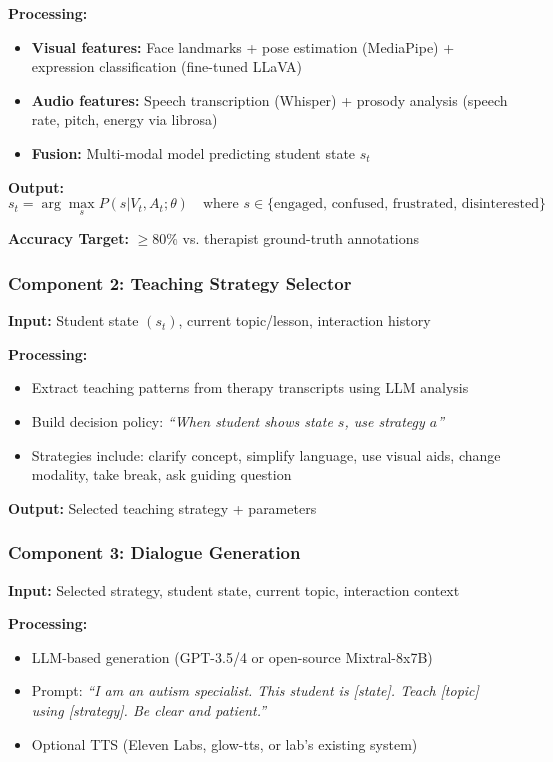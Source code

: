 \documentclass[12pt, a4paper]{article}
\begin{document}
\textbf{Processing:}
\begin{itemize}
    \item \textbf{Visual features:} Face landmarks + pose estimation (MediaPipe) + expression classification (fine-tuned LLaVA)
    \item \textbf{Audio features:} Speech transcription (Whisper) + prosody analysis (speech rate, pitch, energy via librosa)
    \item \textbf{Fusion:} Multi-modal model predicting student state $s_t$
\end{itemize}

\textbf{Output:} 
\begin{equation}
s_t = \arg\max_s P(s | V_t, A_t; \theta) \quad \text{where } s \in \{\text{engaged, confused, frustrated, disinterested}\}
\end{equation}

\textbf{Accuracy Target:} $\geq 80\%$ vs. therapist ground-truth annotations

\subsubsection{Component 2: Teaching Strategy Selector}

\textbf{Input:} Student state $(s_t)$, current topic/lesson, interaction history

\textbf{Processing:}
\begin{itemize}
    \item Extract teaching patterns from therapy transcripts using LLM analysis
    \item Build decision policy: \textit{``When student shows state $s$, use strategy $a$''}
    \item Strategies include: clarify concept, simplify language, use visual aids, change modality, take break, ask guiding question
\end{itemize}

\textbf{Output:} Selected teaching strategy + parameters

\subsubsection{Component 3: Dialogue Generation}

\textbf{Input:} Selected strategy, student state, current topic, interaction context

\textbf{Processing:}
\begin{itemize}
    \item LLM-based generation (GPT-3.5/4 or open-source Mixtral-8x7B)
    \item Prompt: \textit{``I am an autism specialist. This student is [state]. Teach [topic] using [strategy]. Be clear and patient.''}
    \item Optional TTS (Eleven Labs, glow-tts, or lab's existing system)
\end{itemize}
\end{document}

